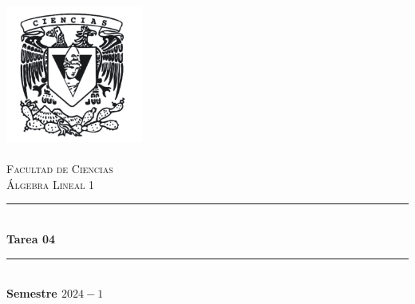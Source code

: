 \begin{titlepage}
\center %
\newcommand{\HRule}{\rule{\linewidth}{0.5mm}} 

\includegraphics[width=4.5cm]{IMA/Ciencias.png} \\ 
\quad \\[1.5cm]
\textsc{\Large Facultad de Ciencias}\\[0.5cm] %
\textsc{\Large Álgebra Lineal 1}\\[0.5cm] %
\makeatletter
    \HRule \\ [0.4cm]
        { \huge \bfseries Tarea 04}\\
    \HRule \\ [0.4cm]
\large\textbf{Semestre $2024-1$}\\


\end{titlepage}
